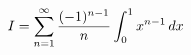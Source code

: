 \documentclass[preview]{standalone}
\begin{document}
\begin{align*}
\special{dvisvgm:raw <g id='unique000'>}I=\sum_{n=1}^{\infty}\frac{(-1)^{n-1}}n\int_0^1x^{n-1}\,dx\special{dvisvgm:raw </g>}
\end{align*}
\end{document}
